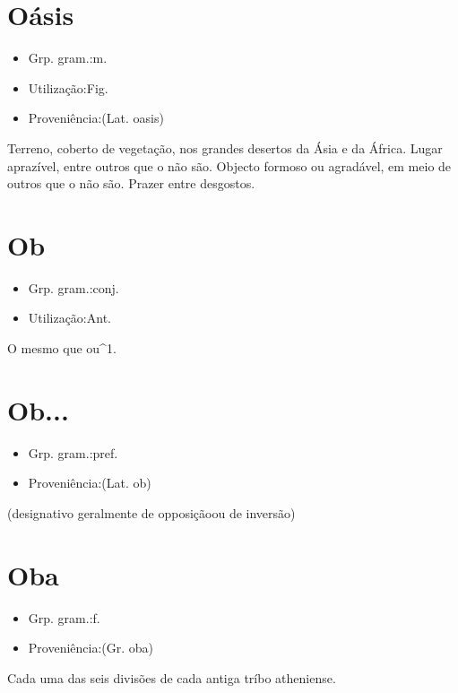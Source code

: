 \section{Oásis}
\begin{itemize}
\item {Grp. gram.:m.}
\end{itemize}
\begin{itemize}
\item {Utilização:Fig.}
\end{itemize}
\begin{itemize}
\item {Proveniência:(Lat. \textunderscore oasis\textunderscore )}
\end{itemize}
Terreno, coberto de vegetação, nos grandes desertos da Ásia e da África.
Lugar aprazível, entre outros que o não são.
Objecto formoso ou agradável, em meio de outros que o não são.
Prazer entre desgostos.
\section{Ob}
\begin{itemize}
\item {Grp. gram.:conj.}
\end{itemize}
\begin{itemize}
\item {Utilização:Ant.}
\end{itemize}
O mesmo que \textunderscore ou\textunderscore ^1.
\section{Ob...}
\begin{itemize}
\item {Grp. gram.:pref.}
\end{itemize}
\begin{itemize}
\item {Proveniência:(Lat. \textunderscore ob\textunderscore )}
\end{itemize}
(designativo geralmente de \textunderscore opposição\textunderscore  ou de \textunderscore inversão\textunderscore )
\section{Oba}
\begin{itemize}
\item {Grp. gram.:f.}
\end{itemize}
\begin{itemize}
\item {Proveniência:(Gr. \textunderscore oba\textunderscore )}
\end{itemize}
Cada uma das seis divisões de cada antiga tríbo atheniense.
